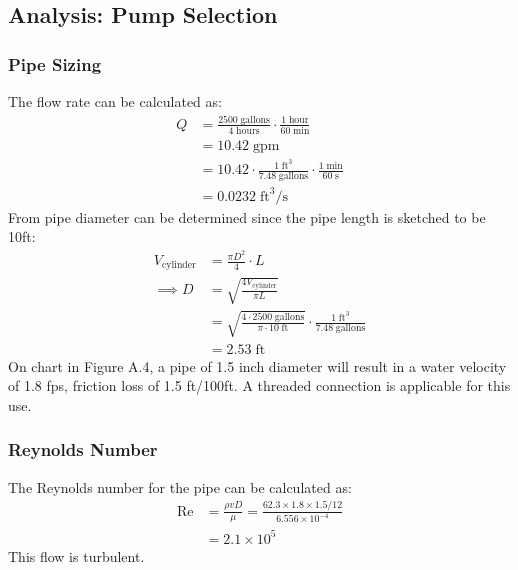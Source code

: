\subsection{Analysis: Pump Selection}
\subsubsection{Pipe Sizing}
The flow rate can be calculated as:
\begin{align*}
    Q & = \frac{2500 \; \text{gallons}}{4 \; \text{hours}} \cdot \frac{1 \; \text{hour}}{60 \; \text{min}}         \\
      & = 10.42 \; \text{gpm}                                                                                      \\
      & = 10.42 \cdot \frac{1 \; \text{ft}^3}{7.48 \; \text{gallons}} \cdot \frac{1 \; \text{min}}{60 \; \text{s}} \\
      & = 0.0232 \; \text{ft}^3/\text{s}
\end{align*}
From pipe diameter can be determined since the pipe length is sketched to be 10ft:
\begin{align*}
    V_{\text{cylinder}} & = \frac{\pi D^2}{4} \cdot L                                                                                                     \\
    \implies D          & = \sqrt{\frac{4 V_{\text{cylinder}}}{\pi L}}                                                                                    \\
                        & = \sqrt{\frac{4 \cdot 2500 \; \text{gallons}}{\pi \cdot 10 \; \text{ft}}} \cdot \frac{1 \; \text{ft}^3}{7.48 \; \text{gallons}} \\
                        & = 2.53 \; \text{ft}
\end{align*}
On chart in Figure A.4, a pipe of 1.5 inch diameter will result in a water velocity of 1.8 fps, friction loss of 1.5 ft/100ft. A threaded connection is applicable for this use.

\subsubsection{Reynolds Number}
The Reynolds number for the pipe can be calculated as:
\begin{align*}
    \text{Re} & = \frac{\rho v D}{\mu} = \frac{62.3 \times 1.8 \times 1.5/12}{6.556 \times 10^{-4}} \\
              & = 2.1 \times 10^5
\end{align*}
This flow is turbulent.

